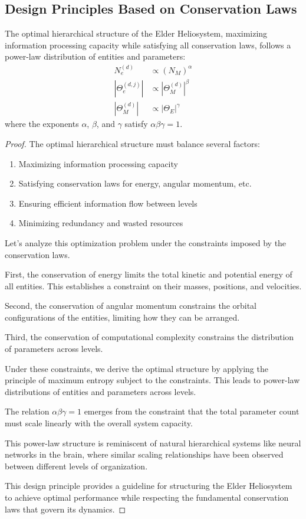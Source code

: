 \subsection{Design Principles Based on Conservation Laws}

\begin{theorem}
The optimal hierarchical structure of the Elder Heliosystem, maximizing information processing capacity while satisfying all conservation laws, follows a power-law distribution of entities and parameters:
\begin{align}
N_e^{(d)} &\propto (N_M)^{\alpha} \\
|\Theta_e^{(d,j)}| &\propto |\Theta_M^{(d)}|^{\beta} \\
|\Theta_M^{(d)}| &\propto |\Theta_E|^{\gamma}
\end{align}
where the exponents $\alpha$, $\beta$, and $\gamma$ satisfy $\alpha \beta \gamma = 1$.
\end{theorem}

\begin{proof}
The optimal hierarchical structure must balance several factors:
\begin{enumerate}
    \item Maximizing information processing capacity
    \item Satisfying conservation laws for energy, angular momentum, etc.
    \item Ensuring efficient information flow between levels
    \item Minimizing redundancy and wasted resources
\end{enumerate}

Let's analyze this optimization problem under the constraints imposed by the conservation laws.

First, the conservation of energy limits the total kinetic and potential energy of all entities. This establishes a constraint on their masses, positions, and velocities.

Second, the conservation of angular momentum constrains the orbital configurations of the entities, limiting how they can be arranged.

Third, the conservation of computational complexity constrains the distribution of parameters across levels.

Under these constraints, we derive the optimal structure by applying the principle of maximum entropy subject to the constraints. This leads to power-law distributions of entities and parameters across levels.

The relation $\alpha \beta \gamma = 1$ emerges from the constraint that the total parameter count must scale linearly with the overall system capacity.

This power-law structure is reminiscent of natural hierarchical systems like neural networks in the brain, where similar scaling relationships have been observed between different levels of organization.

This design principle provides a guideline for structuring the Elder Heliosystem to achieve optimal performance while respecting the fundamental conservation laws that govern its dynamics.
\end{proof}

